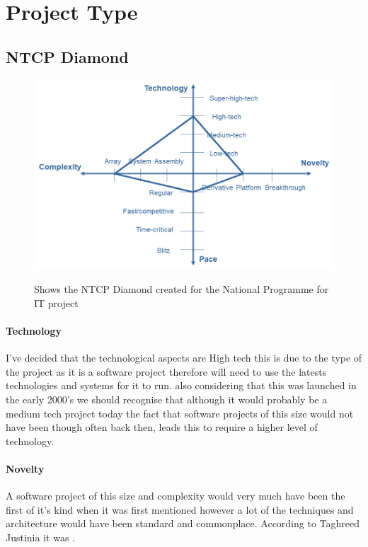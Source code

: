 \documentclass[a4paper,12pt]{scrartcl}
\begin{document}
	\section{Project Type}
	{
		\subsection{NTCP Diamond}
		{
			\begin{figure}
				\centering
				\includegraphics[width=\textwidth]{NationalProgrammeForITNTCP.png}
				\label{fig:NTCPDigram}
				\caption{Shows the NTCP Diamond created for the National Programme for IT project}
			\end{figure}
			\paragraph{Technology}
			{
				I've decided that the technological aspects are High tech this is due to the type of the project as it is a software project therefore will need to use the latests technologies and systems for it to run. also considering that this was launched in the early 2000's we should recognise that although it would probably be a medium tech project today the fact that software projects of this size would not have been though often back then, leads this to require a higher level of technology.
			}
			\paragraph{Novelty}
			{
				A software project of this size and complexity would very much have been the first of it's kind when it was first mentioned however a lot of the techniques and architecture would have been standard and commonplace. According to Taghreed Justinia it was \cite{Justinia2016}. 
			}
}}
\end{document}

